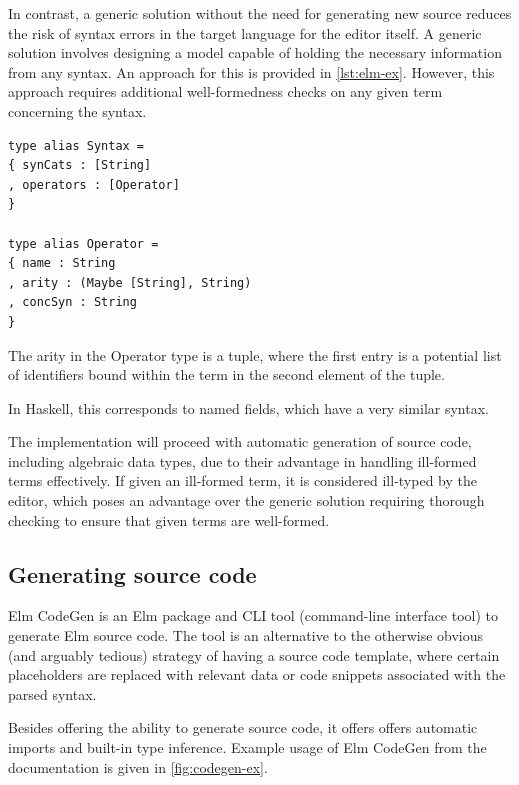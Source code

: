 In contrast, a generic solution without the need for generating new source reduces the risk of syntax errors in the target language for the editor itself. A generic solution involves designing a model capable of holding the necessary information from any syntax. An approach for this is provided in \cref{lst:elm-ex}. However, this approach requires additional well-formedness checks on any given term concerning the syntax.

\begin{lstlisting}[style=inline,caption={Elm Records for storing syntax information},label={lst:elm-ex}]
type alias Syntax =
{ synCats : [String]
, operators : [Operator]
}

type alias Operator =
{ name : String
, arity : (Maybe [String], String)
, concSyn : String
}
\end{lstlisting}

The arity in the Operator type is a tuple, where the first entry is a potential
list of identifiers bound within the term in the second element of the tuple.

In Haskell, this corresponds to named fields\cite{haskell-records-named-fields},
which have a very similar syntax.

The implementation will proceed with automatic generation of source code,
including algebraic data types, due to their advantage in handling ill-formed
terms effectively. If given an ill-formed term, it is considered ill-typed by
the editor, which poses an advantage over the generic solution requiring
thorough checking to ensure that given terms are well-formed.

\subsection{Generating source code}
Elm CodeGen\cite{elm-codegen-package} is an Elm package and
CLI tool (command-line interface tool) to generate Elm source code.
The tool is an alternative to the otherwise obvious (and arguably tedious)
strategy of having a source code template, where certain placeholders are
replaced with relevant data or code snippets associated with the parsed syntax.

Besides offering the ability to generate source code, it offers offers automatic
imports and built-in type inference. Example usage of Elm CodeGen from
the documentation\cite{elm-codegen-package} is given in \cref{fig:codegen-ex}.

